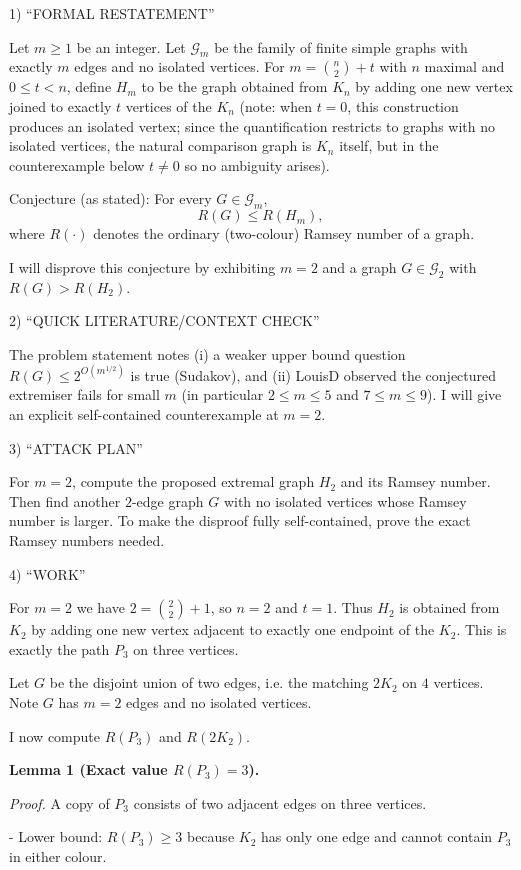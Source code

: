 1) “FORMAL RESTATEMENT”

Let $m\ge 1$ be an integer. Let $\mathcal{G}_m$ be the family of finite simple graphs with exactly $m$ edges and no isolated vertices. For $m=\binom{n}{2}+t$ with $n$ maximal and $0\le t < n$, define $H_m$ to be the graph obtained from $K_n$ by adding one new vertex joined to exactly $t$ vertices of the $K_n$ (note: when $t=0$, this construction produces an isolated vertex; since the quantification restricts to graphs with no isolated vertices, the natural comparison graph is $K_n$ itself, but in the counterexample below $t\neq 0$ so no ambiguity arises).

Conjecture (as stated): For every $G\in\mathcal{G}_m$,
\[
R(G)\le R(H_m),
\]
where $R(\cdot)$ denotes the ordinary (two-colour) Ramsey number of a graph.

I will disprove this conjecture by exhibiting $m=2$ and a graph $G\in\mathcal{G}_2$ with $R(G)>R(H_2)$.

2) “QUICK LITERATURE/CONTEXT CHECK”

The problem statement notes (i) a weaker upper bound question $R(G)\le 2^{O(m^{1/2})}$ is true (Sudakov), and (ii) LouisD observed the conjectured extremiser fails for small $m$ (in particular $2\le m\le 5$ and $7\le m\le 9$). I will give an explicit self-contained counterexample at $m=2$.

3) “ATTACK PLAN”

For $m=2$, compute the proposed extremal graph $H_2$ and its Ramsey number. Then find another $2$-edge graph $G$ with no isolated vertices whose Ramsey number is larger. To make the disproof fully self-contained, prove the exact Ramsey numbers needed.

4) “WORK”

For $m=2$ we have $2=\binom{2}{2}+1$, so $n=2$ and $t=1$. Thus $H_2$ is obtained from $K_2$ by adding one new vertex adjacent to exactly one endpoint of the $K_2$. This is exactly the path $P_3$ on three vertices.

Let $G$ be the disjoint union of two edges, i.e. the matching $2K_2$ on $4$ vertices. Note $G$ has $m=2$ edges and no isolated vertices.

I now compute $R(P_3)$ and $R(2K_2)$.

\textbf{Lemma 1 (Exact value $R(P_3)=3$).}

\emph{Proof.}
A copy of $P_3$ consists of two adjacent edges on three vertices.

- Lower bound: $R(P_3)\ge 3$ because $K_2$ has only one edge and cannot contain $P_3$ in either colour.

